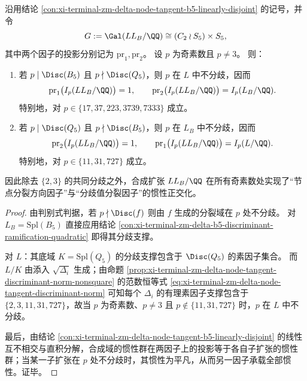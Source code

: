 \begin{conclusion}\label{con:xi-terminal-zm-delta-node-tangent-b5-inertia-orthogonal}
沿用结论 \ref{con:xi-terminal-zm-delta-node-tangent-b5-linearly-disjoint} 的记号，并令
\[
G:=\Gal(LL_B/\QQ)\cong (C_2\wr S_5)\times S_5,
\]
其中两个因子的投影分别记为 \(\mathrm{pr}_1,\mathrm{pr}_2\)。
设 \(p\) 为奇素数且 \(p\neq 3\)。
则：
\begin{enumerate}
  \item 若 \(p\mid \Disc(B_5)\) 且 \(p\nmid \Disc(Q_5)\)，则 \(p\) 在 \(L\) 中不分歧，因而
  \[
  \mathrm{pr}_1\bigl(I_p(LL_B/\QQ)\bigr)=1,\qquad
  \mathrm{pr}_2\bigl(I_p(LL_B/\QQ)\bigr)=I_p(L_B/\QQ).
  \]
  特别地，对 \(p\in\{17,37,223,3739,7333\}\) 成立。
  \item 若 \(p\mid \Disc(Q_5)\) 且 \(p\nmid \Disc(B_5)\)，则 \(p\) 在 \(L_B\) 中不分歧，因而
  \[
  \mathrm{pr}_2\bigl(I_p(LL_B/\QQ)\bigr)=1,\qquad
  \mathrm{pr}_1\bigl(I_p(LL_B/\QQ)\bigr)=I_p(L/\QQ).
  \]
  特别地，对 \(p\in\{11,31,727\}\) 成立。
\end{enumerate}
因此除去 \(\{2,3\}\) 的共同分歧之外，合成扩张 \(LL_B/\QQ\) 在所有奇素数处实现了“节点分裂方向因子”与“分歧值分裂因子”的惯性正交化。
\end{conclusion}
\begin{proof}
由判别式判据，若 \(p\nmid\Disc(f)\) 则由 \(f\) 生成的分裂域在 \(p\) 处不分歧。
对 \(L_B=\mathrm{Spl}(B_5)\) 直接应用结论 \ref{con:xi-terminal-zm-delta-b5-discriminant-ramification-quadratic} 即得其分歧支撑。
\par
对 \(L\)：其底域 \(K=\mathrm{Spl}(Q_5)\) 的分歧支撑包含于 \(\Disc(Q_5)\) 的素因子集合。
而 \(L/K\) 由添入 \(\sqrt{\Delta_i}\) 生成；由命题 \ref{prop:xi-terminal-zm-delta-node-tangent-discriminant-norm-nonsquare} 的范数恒等式 \eqref{eq:xi-terminal-zm-delta-node-tangent-discriminant-norm} 可知每个 \(\Delta_i\) 的有理素因子支撑包含于 \(\{2,3,11,31,727\}\)，故当 \(p\) 为奇素数、\(p\neq 3\) 且 \(p\notin\{11,31,727\}\) 时，\(p\) 在 \(L\) 中不分歧。
\par
最后，由结论 \ref{con:xi-terminal-zm-delta-node-tangent-b5-linearly-disjoint} 的线性互不相交与直积分解，合成域的惯性群在两因子上的投影等于各自子扩张的惯性群；当某一子扩张在 \(p\) 处不分歧时，其惯性为平凡，从而另一因子承载全部惯性。证毕。
\end{proof}

